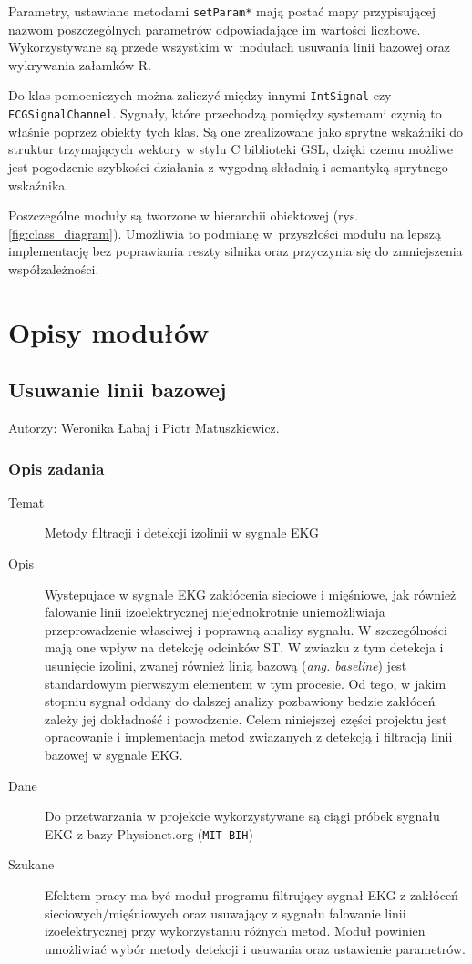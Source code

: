 \documentclass[a4paper, 11pt]{article}
\begin{document}
Parametry, ustawiane metodami \verb+setParam*+ mają postać mapy przypisującej nazwom poszczególnych parametrów odpowiadające im wartości liczbowe. Wykorzystywane są przede wszystkim w~modułach usuwania linii bazowej oraz wykrywania załamków R.

Do klas pomocniczych można zaliczyć między innymi \verb+IntSignal+ czy \verb+ECGSignalChannel+. Sygnały, które przechodzą pomiędzy systemami czynią to właśnie poprzez obiekty tych klas. Są one zrealizowane jako sprytne wskaźniki do struktur trzymających wektory w stylu C biblioteki GSL, dzięki czemu możliwe jest pogodzenie szybkości działania z wygodną składnią i semantyką sprytnego wskaźnika.

Poszczególne moduły są tworzone w hierarchii obiektowej (rys. \ref{fig:class_diagram}). Umożliwia to podmianę w~przyszłości modułu na lepszą implementację bez poprawiania reszty silnika oraz przyczynia się do zmniejszenia współzależności.

\section{Opisy modułów}
\label{sec:mod}

\subsection{Usuwanie linii bazowej}
\label{sec:baseline}
Autorzy: Weronika Łabaj i Piotr Matuszkiewicz.

\subsubsection{Opis zadania}
\label{sec:baseline:desc}

\begin{description}
\item[Temat] Metody filtracji i detekcji izolinii w sygnale EKG
\item[Opis] Wystepujace w sygnale EKG zakłócenia sieciowe i mięśniowe, jak również falowanie linii izoelektrycznej niejednokrotnie uniemożliwiaja przeprowadzenie własciwej i poprawną analizy sygnału. W szczególności mają one wpływ na detekcję odcinków ST. W zwiazku z tym detekcja i usunięcie izolini, zwanej również linią bazową (\textit{ang. baseline}) jest standardowym pierwszym elementem w tym procesie. Od tego, w jakim stopniu sygnał oddany do dalszej analizy pozbawiony bedzie zakłóceń zależy jej dokładność i powodzenie. Celem niniejszej części projektu jest opracowanie i implementacja metod zwiazanych z detekcją i filtracją linii bazowej w sygnale EKG.
\item[Dane] Do przetwarzania w projekcie wykorzystywane są ciągi próbek sygnału EKG z bazy Physionet.org (\verb|MIT-BIH|)
\item[Szukane] Efektem pracy ma być moduł programu filtrujący sygnał EKG z zakłóceń sieciowych/mięśniowych oraz usuwający z sygnału falowanie linii izoelektrycznej przy wykorzystaniu różnych metod. Moduł powinien umożliwiać wybór metody detekcji i usuwania oraz ustawienie parametrów.
\end{description}
\end{document}
